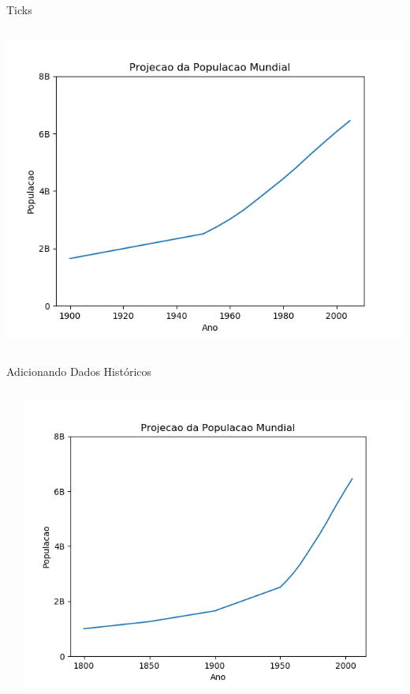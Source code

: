 \begin{frame}{Ticks}
\begin{columns}
    \begin{column}{0.45\textwidth}
      \begin{center}
        \includegraphics[scale=.35]{aula-2/figuras/matplotlib-customization-5.png}
      \end{center}
    \end{column}
  \end{columns}
\end{frame}
%
\begin{frame}[t, fragile]{Adicionando Dados Históricos}
  \begin{columns}
    \begin{column}{0.55\textwidth}
          
    \end{column}

    \begin{column}{0.45\textwidth}
      \begin{center}
        \includegraphics[scale=.35]{aula-2/figuras/matplotlib-customization-6.png}
      \end{center}
    \end{column}
  \end{columns} 
\end{frame}
